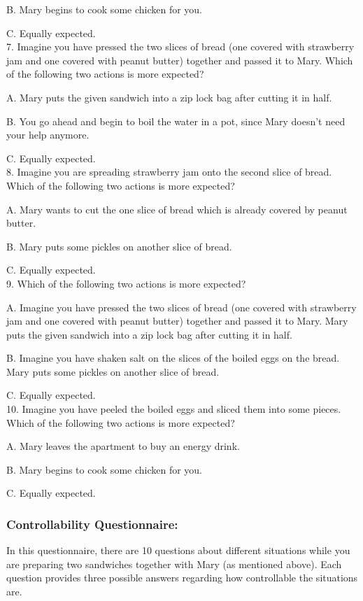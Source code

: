 \documentclass[12pt]{report}
\begin{document}
\begin{appendices}
B. Mary begins to cook some chicken for you.

C. Equally expected.\\


7. Imagine you have pressed the two slices of bread (one covered with strawberry jam and one covered with peanut butter) together and passed it to Mary. Which of the following two actions is more expected?

A. Mary puts the given sandwich into a zip lock bag after cutting it in half.

B. You go ahead and begin to boil the water in a pot, since Mary doesn't need your help anymore.

C. Equally expected.\\


8. Imagine you are spreading strawberry jam onto the second slice of bread. Which of the following two actions is more expected?

A. Mary wants to cut the one slice of bread which is already covered by peanut butter.

B. Mary puts some pickles on another slice of bread.

C. Equally expected.\\


9. Which of the following two actions is more expected?

A. Imagine you have pressed the two slices of bread (one covered with strawberry jam and one covered with peanut butter) together and passed it to Mary. Mary puts the given sandwich into a zip lock bag after cutting it in half.

B. Imagine you have shaken salt on the slices of the boiled eggs on the bread. Mary puts some pickles on another slice of bread.

C. Equally expected.\\


10. Imagine you have peeled the boiled eggs and sliced them into some pieces. Which of the following two actions is more expected?

A. Mary leaves the apartment to buy an energy drink.

B. Mary begins to cook some chicken for you.

C. Equally expected.\\

\pagebreak

\subsubsection{Controllability Questionnaire:}
In this questionnaire, there are 10 questions about different situations while
you are preparing two sandwiches together with Mary (as mentioned above). Each
question provides three possible answers regarding how controllable the
situations are.


\end{appendices}
\end{document}
